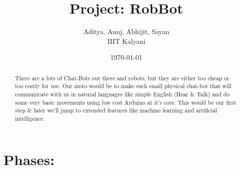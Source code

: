 \documentclass{article}
\begin{document}
	\title{Project: RobBot}
	\author{Aditya, Anuj, Abhijit, Sayan\\IIIT Kalyani\\}
	\date{\today}
	\maketitle
	\begin{abstract}
	There are a lots of Chat-Bots out there and robots, but they are either too cheap or too costly for use. Our moto would be to make such small physical chat-bot that will communicate with us in natural languages like simple English (Hear \& Talk) and do some very basic movements using low cost Arduino at it's core. This would be our first step \& later we'll jump to extended features like machine learning and artificial intelligence.
	\end{abstract}
	\section{Phases:}
\end{document}
